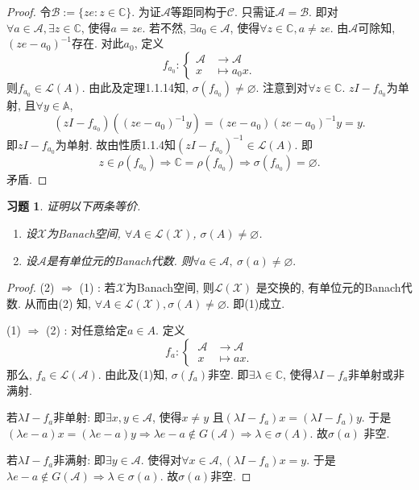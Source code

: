 \documentclass[UTF8,twoside]{ctexbook}
\newtheorem{exercise}{习题}[section]
\newcommand{\h}{\mathscr}
\newcommand{\kx}{\mathbb}
\numberwithin{equation}{section}
\begin{document}
	\begin{proof}
		令$\h B:=\{ze:z\in\kx C\}$. 为证$\h A$等距同构于$\h C$. 只需证$\h A=\h B$. 即对$\forall a\in \h A,\exists z\in\kx C$, 使得$a=ze$. 若不然, $\exists a_0\in\h A$, 使得$\forall z\in\kx C, a\neq ze$. 由$\h A$可除知, $(ze-a_0)^{-1}$存在. 对此$a_0$, 定义
		\[
		f_{a_0}:\left\{
		\begin{aligned}
		\h A&\rightarrow \h A\\
		x&\mapsto a_0 x.
		\end{aligned}
		\right.
		\]
		则$f_{a_0}\in\h L(A)$. 由此及定理1.1.14知, $\sigma(f_{a_0})\neq\varnothing$. 注意到对$\forall z\in \kx C$. $zI-f_{a_0}$为单射, 且$\forall y\in\kx A$,
		\[
		(zI-f_{a_0})((ze-a_0)^{-1}y)=(ze-a_0)(ze-a_0)^{-1}y=y.
		\]
		即$zI-f_{a_0}$为单射. 故由性质1.1.4知$(zI-f_{a_0})^{-1}\in\h L(A)$. 即
		\[
		z\in\rho(f_{a_0})\Rightarrow \kx C=\rho(f_{a_0})\Rightarrow \sigma(f_{a_0})=\varnothing.
		\]
		矛盾.
	\end{proof}
	\begin{exercise}
		证明以下两条等价.
		\begin{enumerate}[1)]
			\item 设$\h X$为Banach空间, $\forall A\in\h L(\h X)$, $\sigma(A)\neq\varnothing$.
			\item 设$\h A$是有单位元的Banach代数. 则$\forall a\in\h A,\ \sigma(a)\neq\varnothing.$
		\end{enumerate}
	\end{exercise}
	\begin{proof}
		(2) $\Rightarrow$ (1) : 若$\h X$为Banach空间, 则$\h L(\h X)$ 是交换的, 有单位元的Banach代数. 从而由(2) 知, $\forall A\in\h L(\h X), \sigma(A)\neq\varnothing$. 即(1)成立.

		(1) $\Rightarrow$ (2) : 对任意给定$a\in A$. 定义
		\[
		f_a:\left\{\
		\begin{aligned}
		\h A &\rightarrow \h A\\
		x &\mapsto ax.
		\end{aligned}
		\right.
		\]
		那么, $f_a\in\h L(\h A)$. 由此及(1)知, $\sigma(f_a)$非空. 即$\exists \lambda\in\kx C$, 使得$\lambda I-f_a$非单射或非满射.

		若$\lambda I-f_a$非单射: 即$\exists x,y\in\h A$, 使得$x\neq y$ 且$(\lambda I-f_a)x=(\lambda I-f_a)y$. 于是$(\lambda e-a)x=(\lambda e - a)y\Rightarrow \lambda e -a \notin G(\h A) \Rightarrow \lambda\in\sigma(A)$. 故$\sigma(a)$ 非空.

		若$\lambda I - f_a$非满射: 即$\exists y\in \h A$. 使得对$\forall x\in\h A, (\lambda I-f_a)x=y$. 于是$\lambda e-a\notin G(\h A)\Rightarrow \lambda\in\sigma(a)$. 故$\sigma(a)$非空.
	\end{proof}
\end{document}

